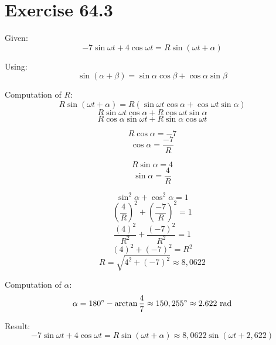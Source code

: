 \documentclass[a4paper, 10pt]{scrartcl}
\begin{document}
\section{Exercise 64.3}

Given:
\[-7\sin{\omega t} + 4\cos{\omega t} = R\sin{(\omega t + \alpha)}\]

Using:
\[\sin{(\alpha + \beta)} = \sin{\alpha}\cos{\beta} + \cos{\alpha}\sin{\beta}\]

Computation of $R$:
\[R\sin{(\omega t + \alpha)} =
R(\sin{\omega t}\cos{\alpha} + \cos{\omega t}\sin{\alpha})\]
\[R\sin{\omega t}\cos{\alpha} + R\cos{\omega t}\sin{\alpha}\]
\[R\cos{\alpha}\sin{\omega t} + R\sin{\alpha}\cos{\omega t}\]

\[R\cos{\alpha} = -7\]
\[\cos{\alpha} = \frac{-7}{R}\]

\[R\sin{\alpha} = 4\]
\[\sin{\alpha} = \frac{4}{R}\]

\[\sin^{2}{\alpha} + \cos^{2}{\alpha} = 1\]
\[\left(\frac{4}{R}\right)^{2} + \left(\frac{-7}{R}\right)^{2} = 1\]
\[\frac{(4)^{2}}{R^{2}} + \frac{(-7)^{2}}{R^{2}} = 1\]
\[(4)^{2} + (-7)^{2} = R^{2}\]
\[R = \sqrt{4^{2} + (-7)^{2}} \approx 8,0622\]

Computation of $\alpha$:
\[\alpha = 180^\circ - \arctan{\frac{4}{7}} \approx 150,255^\circ \approx 2.622 \textnormal{ rad}\]

Result:
\[-7\sin{\omega t} + 4\cos{\omega t} = R\sin{(\omega t + \alpha)} \approx
8,0622\sin{(\omega t + 2,622)}\]
\end{document}
